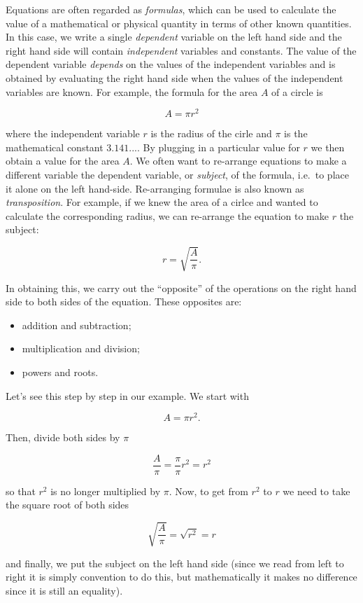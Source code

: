 \documentclass[
]{book}
\providecommand{\tightlist}{%
  \setlength{\itemsep}{0pt}\setlength{\parskip}{0pt}}
\theoremstyle{definition}
\theoremstyle{definition}
\theoremstyle{definition}
\theoremstyle{definition}
\theoremstyle{remark}
\begin{document}
Equations are often regarded as \emph{formulas}, which can be used to calculate the value of a mathematical or physical quantity in terms of other known quantities. In this case, we write a single \emph{dependent} variable on the left hand side and the right hand side will contain \emph{independent} variables and constants. The value of the dependent variable \emph{depends} on the values of the independent variables and is obtained by evaluating the right hand side when the values of the independent variables are known. For example, the formula for the area \(A\) of a circle is

\[A=\pi r^2\]

where the independent variable \(r\) is the radius of the cirle and \(\pi\) is the mathematical constant \(3.141...\). By plugging in a particular value for \(r\) we then obtain a value for the area \(A\). We often want to re-arrange equations to make a different variable the dependent variable, or \emph{subject}, of the formula, i.e.~to place it alone on the left hand-side. Re-arranging formulae is also known as \emph{transposition}. For example, if we knew the area of a cirlce and wanted to calculate the corresponding radius, we can re-arrange the equation to make \(r\) the subject:

\[r=\sqrt{\frac{A}{\pi}}.\]

In obtaining this, we carry out the ``opposite'' of the operations on the right hand side to both sides of the equation. These opposites are:

\begin{itemize}
\tightlist
\item
  addition and subtraction;
\item
  multiplication and division;
\item
  powers and roots.
\end{itemize}

Let's see this step by step in our example. We start with

\[A=\pi r^2.\]

Then, divide both sides by \(\pi\)

\[\frac{A}{\pi}=\frac{\pi}{\pi}r^2=r^2\]

so that \(r^2\) is no longer multiplied by \(\pi\). Now, to get from \(r^2\) to \(r\) we need to take the square root of both sides

\[\sqrt{\frac{A}{\pi}}=\sqrt{r^2}=r\]

and finally, we put the subject on the left hand side (since we read from left to right it is simply convention to do this, but mathematically it makes no difference since it is still an equality).
\end{document}

